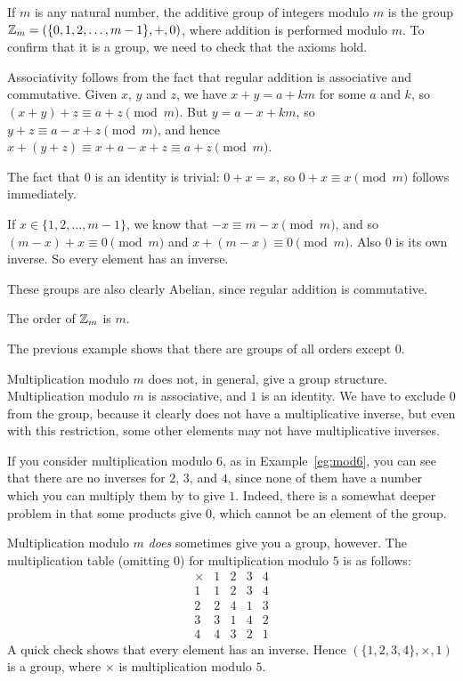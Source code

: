 \begin{example}
  If $m$ is any natural number, the additive group of integers modulo $m$ is
  the group $\mathbb{Z}_{m} = (\{0, 1, 2, \ldots, m-1\}, +, 0)$, where addition
  is performed modulo $m$.  To confirm that it is a group, we need to check
  that the axioms hold.
  
  Associativity follows from the fact that regular addition is associative and commutative.
  Given $x$, $y$ and $z$, we have $x + y = a + km$ for some $a$ and $k$, so
  $(x + y) + z \equiv a + z \pmod{m}$.  But $y = a - x + km$, so $y + z
  \equiv a - x + z \pmod{m}$, and hence $x + (y + z) \equiv x + a - x + z \equiv a
  + z \pmod{m}$.
  
  The fact that $0$ is an identity is trivial: $0 + x = x$, so $0 + x \equiv x \pmod{m}$
  follows immediately.
  
  If $x \in \{1, 2, \ldots, m-1\}$, we know that $-x \equiv m-x \pmod{m}$, and so
  $(m - x) + x \equiv 0 \pmod{m}$ and $x + (m - x) \equiv 0 \pmod{m}$.  Also
  $0$ is its own inverse. So every element has an inverse.
  
  These groups are also clearly Abelian, since regular addition is commutative.
  
  The order of $\mathbb{Z}_{m}$ is $m$.
\end{example}

The previous example shows that there are groups of all orders except $0$.

\begin{example}
  Multiplication modulo $m$ does not, in general, give a group structure.
  Multiplication modulo $m$ is associative, and $1$ is an identity.
  We have to exclude $0$ from the group, because it clearly does not
  have a multiplicative inverse, but even with this restriction, some other
  elements may not have multiplicative inverses.
  
  If you consider multiplication modulo $6$, as in Example~\ref{eg:mod6},
  you can see that there are no inverses for $2$, $3$, and $4$, since none
  of them have a number which you can multiply them by to give $1$.  Indeed,
  there is a somewhat deeper problem in that some products give $0$, which
  cannot be an element of the group.
  
  Multiplication modulo $m$ {\em does} sometimes give you a group, however.
  The multiplication table (omitting $0$) for multiplication modulo $5$ is
  as follows:
  \[
    \begin{array}{c|cccc}
      \times & 1 & 2 & 3 & 4 \\
      \hline
      1 & 1 & 2 & 3 & 4 \\
      2 & 2 & 4 & 1 & 3 \\
      3 & 3 & 1 & 4 & 2 \\
      4 & 4 & 3 & 2 & 1
    \end{array}
  \]
  A quick check shows that every element has an inverse.  Hence
  $(\{1, 2, 3, 4\}, \times, 1)$ is a group, where $\times$ is multiplication
  modulo $5$.
\end{example}

